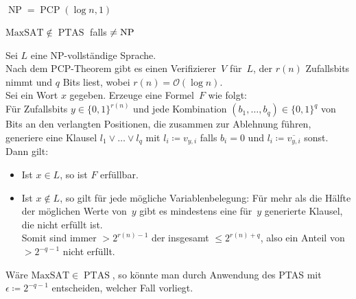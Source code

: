 \documentclass{cheat-sheet}
\DeclareMathOperator{\NP}{NP} %
\let\P\relax %
\DeclareMathOperator{\P}{P} %
\DeclareMathOperator{\PTAS}{PTAS} %
\DeclareMathOperator{\PCP}{PCP} %
\renewcommand{\O}{\mathcal{O}} %
\begin{document}
\begin{resultat}
  $\NP = \PCP(\log n, 1)$
\end{resultat}


\begin{satz}
  $\mathrm{MaxSAT} \not\in \PTAS$ falls $\P \neq \NP$
\end{satz}

\begin{beweisskizze}
  Sei $L$ eine NP-vollständige Sprache. \\
  Nach dem PCP-Theorem gibt es einen Verifizierer~$V$ für~$L$, der $r(n)$ Zufallsbits nimmt und $q$ Bits liest, wobei $r(n) = \O(\log n)$. \\
  Sei ein Wort $x$ gegeben.
  Erzeuge eine Formel~$F$ wie folgt: \\
  Für Zufallsbits $y \in \{ 0, 1 \}^{r(n)}$ und jede Kombination $(b_1, \ldots, b_q) \in \{ 0, 1 \}^q$ von Bits an den verlangten Positionen, die zusammen zur Ablehnung führen, generiere eine Klausel $l_1 \vee \ldots \vee l_q$ mit $l_i \coloneqq v_{y,i}$ falls $b_i = 0$ und $l_i \coloneqq \overline{v_{y,i}}$ sonst.
  Dann gilt:
  \begin{itemize}
    \item Ist $x \in L$, so ist $F$ erfüllbar.
    \item Ist $x \not\in L$, so gilt für jede mögliche Variablenbelegung: Für mehr als die Hälfte der möglichen Werte von~$y$ gibt es mindestens eine für~$y$ generierte Klausel, die nicht erfüllt ist. \\
    Somit sind immer $> 2^{r(n) - 1}$ der insgesamt $\leq 2^{r(n) + q}$, also ein Anteil von $> 2^{-q-1}$ nicht erfüllt.
  \end{itemize}
  Wäre $\mathrm{MaxSAT} \in \PTAS$, so könnte man durch Anwendung des PTAS mit $\epsilon \coloneqq 2^{-q-1}$ entscheiden, welcher Fall vorliegt.
\end{beweisskizze}

\end{document}
